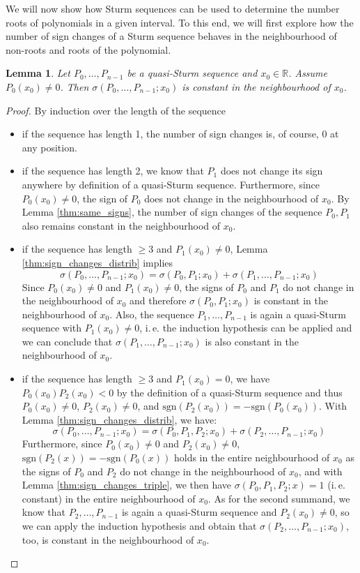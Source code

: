 \documentclass[11pt,a4paper,oneside]{article}
\newtheorem{lemma}[definition]{Lemma}
\newcommand{\RR}{\mathbb{R}}
\newcommand{\sgn}{\mathrm{sgn}}
\newcommand{\ie}{i.\,e.\xspace}
\begin{document}
We will now show how Sturm sequences can be used to determine the number roots of polynomials in a given interval. To this end, we will first explore how the number of sign changes of a Sturm sequence behaves in the neighbourhood of non-roots and roots of the polynomial.\\

\begin{lemma}\label{thm:nonzero}
Let $P_0,\ldots,P_{n-1}$ be a quasi-Sturm sequence and $x_0\in\RR$. Assume $P_0(x_0)\neq 0$. Then $\sigma(P_0,\ldots,P_{n-1}; x_0)$ is constant in the neighbourhood of $x_0$.
\end{lemma}
\begin{proof}
By induction over the length of the sequence
\begin{itemize}
\item if the sequence has length 1, the number of sign changes is, of course, $0$ at any position.
\item if the sequence has length 2, we know that $P_1$ does not change its sign anywhere by definition of a quasi-Sturm sequence. Furthermore, since $P_0(x_0)\neq 0$, the sign of $P_0$ does not change in the neighbourhood of $x_0$. By Lemma \ref{thm:same_signs}, the number of sign changes of the sequence $P_0,P_1$ also remains constant in the neighbourhood of $x_0$.
\item if the sequence has length $\geq 3$ and $P_1(x_0)\neq 0$, Lemma \ref{thm:sign_changes_distrib} implies $$\sigma(P_0,\ldots,P_{n-1}; x_0)=\sigma(P_0,P_1;x_0)+\sigma(P_1,\ldots,P_{n-1};x_0)$$ Since $P_0(x_0)\neq 0$ and $P_1(x_0)\neq 0$, the signs of $P_0$ and $P_1$ do not change in the neighbourhood of $x_0$ and therefore $\sigma(P_0, P_1;x_0)$ is constant in the neighbourhood of $x_0$. Also, the sequence $P_1,\ldots,P_{n-1}$ is again a quasi-Sturm sequence with $P_1(x_0)\neq 0$, \ie the induction hypothesis can be applied and we can conclude that $\sigma(P_1,\ldots,P_{n-1};x_0)$ is also constant in the neighbourhood of $x_0$.
\item if the sequence has length $\geq 3$ and $P_1(x_0)=0$, we have $P_0(x_0)P_2(x_0)<0$ by the definition of a quasi-Sturm sequence and thus $P_0(x_0)\neq 0$, $P_2(x_0)\neq 0$, and $\sgn(P_2(x_0))=-\sgn(P_0(x_0))$. With Lemma \ref{thm:sign_changes_distrib}, we have: $$\sigma(P_0,\ldots,P_{n-1}; x_0) = \sigma(P_0,P_1,P_2;x_0) + \sigma(P_2,\ldots,P_{n-1}; x_0)$$ Furthermore, since $P_0(x_0)\neq 0$ and $P_2(x_0)\neq 0$, $\sgn(P_2(x))=-\sgn(P_0(x))$ holds in the entire neighbourhood of $x_0$ as the signs of $P_0$ and $P_2$ do not change in the neighbourhood of $x_0$, and with Lemma \ref{thm:sign_changes_triple}, we then have $\sigma(P_0,P_1,P_2;x)=1$ (\ie constant) in the entire neighbourhood of $x_0$. As for the second summand, we know that $P_2,\ldots,P_{n-1}$ is again a quasi-Sturm sequence and $P_2(x_0)\neq 0$, so we can apply the induction hypothesis and obtain that $\sigma(P_2,\ldots,P_{n-1};x_0)$, too, is constant in the neighbourhood of $x_0$.
\end{itemize}
\end{proof}
\end{document}
